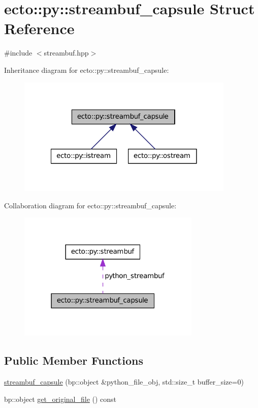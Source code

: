 \hypertarget{structecto_1_1py_1_1streambuf__capsule}{\section{ecto\-:\-:py\-:\-:streambuf\-\_\-capsule \-Struct \-Reference}
\label{structecto_1_1py_1_1streambuf__capsule}
}


{\ttfamily \#include $<$streambuf.\-hpp$>$}



\-Inheritance diagram for ecto\-:\-:py\-:\-:streambuf\-\_\-capsule\-:\nopagebreak
\begin{figure}[H]
\begin{center}
\leavevmode
\includegraphics[width=294pt]{structecto_1_1py_1_1streambuf__capsule__inherit__graph}
\end{center}
\end{figure}


\-Collaboration diagram for ecto\-:\-:py\-:\-:streambuf\-\_\-capsule\-:\nopagebreak
\begin{figure}[H]
\begin{center}
\leavevmode
\includegraphics[width=247pt]{structecto_1_1py_1_1streambuf__capsule__coll__graph}
\end{center}
\end{figure}
\subsection*{\-Public \-Member \-Functions}
\begin{DoxyCompactItemize}
\item 
\hyperlink{structecto_1_1py_1_1streambuf__capsule_ad175cd2ce674303c092041a5da481b73}{streambuf\-\_\-capsule} (bp\-::object \&python\-\_\-file\-\_\-obj, std\-::size\-\_\-t buffer\-\_\-size=0)
\item 
bp\-::object \hyperlink{structecto_1_1py_1_1streambuf__capsule_a716c8fa0af952120d46dd781409c4af4}{get\-\_\-original\-\_\-file} () const 
\end{DoxyCompactItemize}
